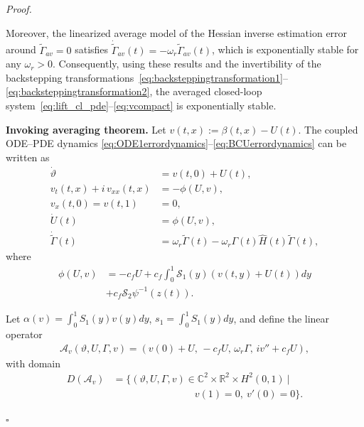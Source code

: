 \documentclass[letterpaper, 10 pt, conference]{ieeeconf}  %
\newenvironment{pf}
{\noindent\textit{Proof.}\hspace{1.2mm}}
{\hspace{\fill}$\square$}
\begin{document}
\begin{pf}


Moreover, the linearized average model of the Hessian inverse estimation error around $\tilde{\Gamma}_{av} = 0$ satisfies $\dot{\tilde{\Gamma}}_{av}(t) = -\omega_r \tilde{\Gamma}_{av}(t)$, which is exponentially stable for any $\omega_r > 0$. Consequently, using these results and the invertibility of the backstepping transformations~\eqref{eq:backsteppingtransformation1}--\eqref{eq:backsteppingtransformation2}, the averaged closed-loop system~\eqref{eq:lift_cl_pde}--\eqref{eq:vcompact} is exponentially stable.



\textbf{Invoking averaging theorem.} Let $v(t,x):=\beta(t,x)-U(t)$. The coupled ODE–PDE dynamics \eqref{eq:ODE1errordynamics}–\eqref{eq:BCUerrordynamics} can be written as
\begin{align}
\dot{\vartheta}&=v(t,0)+U(t),\label{eq:lift_cl_pde}\\
v_t(t,x)+i\,v_{xx}(t,x)&=-\phi(U,v),\\
v_x(t,0)=v(t,1)&=0,\\ 
\dot{U}(t)&=\phi(U,v),\\
\dot{\tilde{\Gamma}}(t)&=\omega_r\tilde{\Gamma}(t)-\omega_r\Gamma(t)\hat{H}(t)\tilde{\Gamma}(t), \label{eq:vcompact}
\end{align}
where
\begin{align*}
\phi(U,v)&=-c_fU+c_f\!\int_0^1\!\mathcal{S}_1(y)\!\left(v(t,y)+U(t)\right)\!dy\\
&+c_f\mathcal{S}_2 \psi^{-1}(z(t)).
\end{align*}

Let $\alpha(v) = \int_0^1S_1(y)v(y)dy$, $s_1 = \int_0^1S_1(y)dy$, and define the linear operator
\begin{align*}
    \mathcal{A}_{v}(\vartheta,U,\Gamma,v) = (v(0)+U, \, - c_f U,\, \omega_r\Gamma,\, iv''+c_fU),
\end{align*}
\noindent with domain
\begin{align*}
    D(\mathcal{A}_{v}) &= 
    \Big\{(\vartheta,U,\Gamma,v)\in \mathbb{C}^{2}\times\mathbb{R}^{2}\times H^{2}(0,1)\ \big|\nonumber \\
    &\qquad \qquad \qquad \qquad \ v(1)=0,\ v'(0)=0 \Big\}.
\end{align*}


\end{pf}
\end{document}
